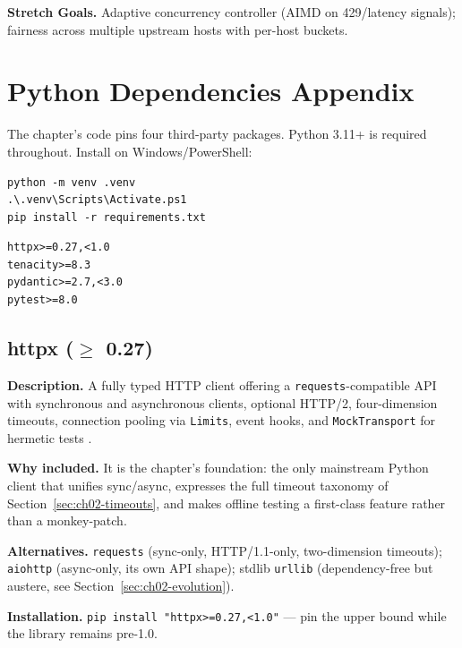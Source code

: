 \textbf{Stretch Goals.} Adaptive concurrency controller (AIMD on 429/latency
signals); fairness across multiple upstream hosts with per-host buckets.


\section{Python Dependencies Appendix}
\label{sec:ch02-dependencies}

The chapter's code pins four third-party packages. Python 3.11+ is required
throughout. Install on Windows/PowerShell:

\begin{verbatim}
python -m venv .venv
.\.venv\Scripts\Activate.ps1
pip install -r requirements.txt
\end{verbatim}

\begin{verbatim}
httpx>=0.27,<1.0
tenacity>=8.3
pydantic>=2.7,<3.0
pytest>=8.0
\end{verbatim}

\subsection{httpx ($\geq$ 0.27)}

\textbf{Description.} A fully typed HTTP client offering a
\texttt{requests}-compatible API with synchronous and asynchronous clients,
optional HTTP/2, four-dimension timeouts, connection pooling via
\texttt{Limits}, event hooks, and \texttt{MockTransport} for hermetic tests
\cite{httpxdocs}.

\textbf{Why included.} It is the chapter's foundation: the only mainstream
Python client that unifies sync/async, expresses the full timeout taxonomy of
Section~\ref{sec:ch02-timeouts}, and makes offline testing a first-class
feature rather than a monkey-patch.

\textbf{Alternatives.} \texttt{requests} \cite{requestsdocs} (sync-only,
HTTP/1.1-only, two-dimension timeouts); \texttt{aiohttp} (async-only, its own
API shape); stdlib \texttt{urllib} (dependency-free but austere, see
Section~\ref{sec:ch02-evolution}).

\textbf{Installation.} \texttt{pip install "httpx>=0.27,<1.0"} --- pin the
upper bound while the library remains pre-1.0.

